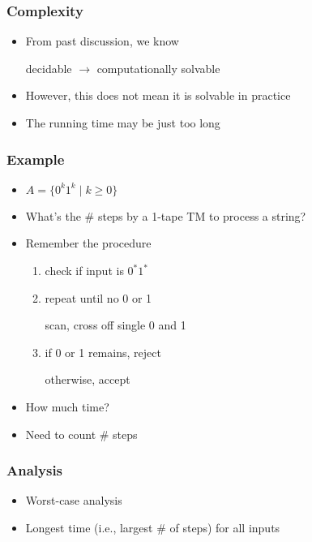 




\begin{frame}[allowframebreaks] \frametitle{Complexity}
  \begin{itemize}
  \item From past discussion, we know
    \begin{center}
    decidable $\rightarrow$ computationally solvable
  \end{center}
\item However, this does not mean it is solvable in practice
\item The running time may be just too long
\end{itemize}\end{frame} \begin{frame}[allowframebreaks] \frametitle{Example}
  \begin{itemize}
\item $A=\{0^k 1^k\mid k \geq 0\}$

\item [] What's the \# steps by a 1-tape TM to process a string? 
\item Remember the procedure
  \begin{enumerate}
  \item check if input is $0^* 1^*$
  \item repeat until no 0 or 1

scan, cross off single 0 and 1
\item if 0 or 1 remains, reject

otherwise, accept

  \end{enumerate}
\item How much time?

\item [] Need to count \# steps
\end{itemize}\end{frame} \begin{frame}[allowframebreaks] \frametitle{Analysis}
  \begin{itemize}
\item Worst-case analysis

\item [] Longest time (i.e., largest \# of steps) for all inputs


\end{itemize}
\end{frame}
